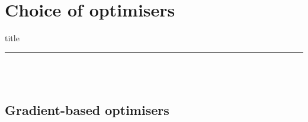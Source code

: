 \documentclass[aspectratio=169]{beamer} %
\begin{document}
\section{Choice of optimisers}
\begin{frame}[plain]
    \centering
    \begin{beamercolorbox}[sep=8pt,center,shadow=true,rounded=true]{title}
    \insertsectionhead\par%
    \color{oxfordblue}\noindent\rule{10cm}{1pt} \\
    \LARGE{\faBalanceScale} \\
    \end{beamercolorbox}
\end{frame}

\subsection{Gradient-based optimisers}
\end{document}

